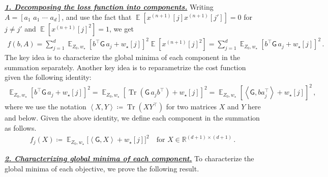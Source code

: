 \documentclass{article}
\DeclareMathOperator{\E}{\mathbb{E}}
\newcommand{\R}{\mathbb{R}}
\newcommand{\bb}{A}
\newcommand{\bbb}{a}
\newcommand{\cc}{b}
\newcommand{\wstar}{w_\star}
\newcommand{\tx}[1]{x^{(#1)}}
\newcommand{\MM}{\mathsf{G}}
\newcommand{\emphh}[1]{\textbf{\emph{#1}}}
\DeclareMathOperator{\tr}{Tr}
\newcommand{\inp}[2]{\left \langle #1,#2\right\rangle}
\begin{document}
\underline{\emphh{1. Decomposing the loss function into components.}}
Writing $\bb = [\bbb_1\,\, \bbb_1 \,\, \cdots \,\, \bbb_d ]$, and use the fact that $\E[\tx{n+1}[j]\tx{n+1}[j']] =0$ for $j\neq j'$ and $\E[\tx{n+1}[j]^2] =1$, we get
\begin{align}
f\left(\cc, \bb\right) = \sum_{j=1}^d \E_{Z_0,\wstar}\left[ \cc^\top \MM \,\bbb_j + \wstar[j] \right]^2 \E[\tx{n+1}[j]^2]  = \sum_{j=1}^d \E_{Z_0,\wstar}\left[ \cc^\top \MM \,\bbb_j  + \wstar[j] \right]^2 \,. 
\end{align}
The key idea is to characterize the global minima of each component in the summation separately.
Another key idea is to reparametrize the cost function  given the following identity:
\begin{align}
\E_{Z_0,\wstar}\left[ \cc^\top \MM \,\bbb_j  + \wstar[j] \right]^2 = \E_{Z_0,\wstar}\left[ \tr (\MM \,\bbb_j \cc^\top)  + \wstar[j] \right]^2= \E_{Z_0,\wstar}\left[\inp{\MM}{\cc \bbb_j^\top}  + \wstar[j] \right]^2\,,
\end{align}
where we use the notation $\inp{X}{Y} \coloneqq \tr(XY^\top)$ for two matrices $X$ and $Y$ here and below.
Given the above identity, we define each component in the summation as follows.
\begin{align}
\boxed{f_j(X)\coloneqq   \E_{Z_0,\wstar}\Big[\inp{\MM}{X}  + \wstar[j] \Big]^2\quad \text{for }  X\in \R^{(d+1)\times (d+1)}\,.}
\end{align} 



\underline{\emphh{2. Characterizing global minima of each component.}} 
To characterize the global minima of each objective, we prove the following result.
\end{document}
